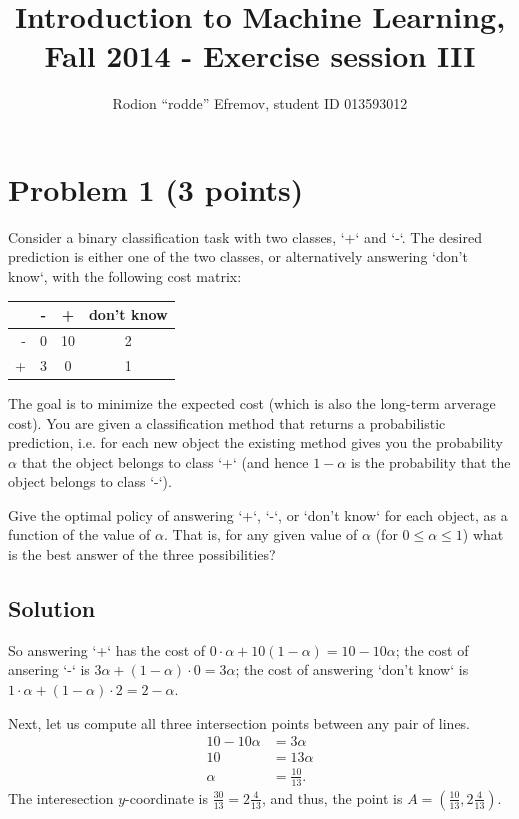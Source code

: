 \documentclass[10pt]{article}
\title{Introduction to Machine Learning, Fall 2014 - Exercise session III}
\author{Rodion ``rodde'' Efremov, student ID 013593012}
\begin{document}
 \maketitle

\section*{Problem 1 (3 points)}
\color{blue}
Consider a binary classification task with two classes, `+` and `-`. The desired prediction is either one of the two classes,  or alternatively answering `don't know`, with the following cost matrix:
\color{black}
\begin{center}
\begin{tabular}{r|c|c|c|}
 & - & + & don't know \\
\hline
- & 0 & 10 & 2 \\
\hline
+ & 3 & 0 & 1 \\
\hline
\end{tabular}
\end{center}
\color{blue}
The goal is to minimize the expected cost (which is also the long-term arverage cost). You are given a classification method that returns a probabilistic prediction, i.e. for each new object the existing method gives you the probability $\alpha$ that the object belongs to class `+` (and hence $1 - \alpha$ is the probability that the object belongs to class `-`).

\noindent Give the optimal policy of answering `+`, `-`, or `don't know` for each object, as a function of the value of $\alpha$. That is, for any given value of $\alpha$ (for $0 \leq \alpha \leq 1$) what is the best answer of the three possibilities?
\color{black}

\subsection*{Solution}
So answering `+` has the cost of $0 \cdot \alpha + 10 (1 - \alpha) = 10 - 10\alpha$; the cost of ansering `-` is $3\alpha + (1 - \alpha) \cdot 0 = 3\alpha$; the cost of answering `don't know` is $1 \cdot \alpha + (1 - \alpha) \cdot 2 = 2 - \alpha$.

Next, let us compute all three intersection points between any pair of lines.
\begin{align*}
10 - 10\alpha &= 3\alpha \\
10 &= 13\alpha \\
\alpha &= \frac{10}{13}.
\end{align*}
The interesection $y$-coordinate is $\frac{30}{13} = 2\frac{4}{13}$, and thus, the point is $A = (\frac{10}{13}, 2\frac{4}{13})$.
\end{document}
